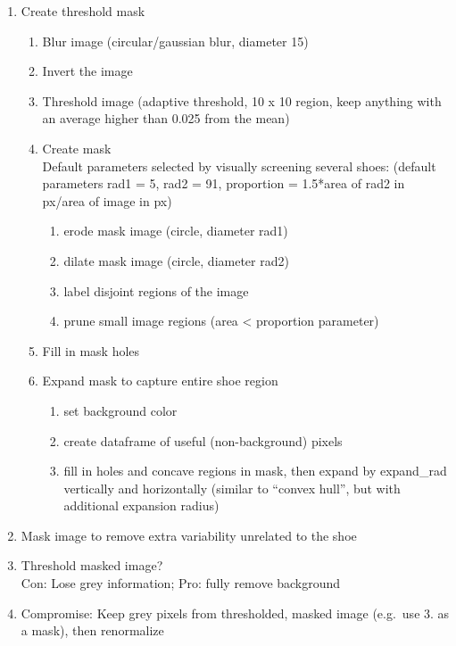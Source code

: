 \documentclass[]{book}
\providecommand{\tightlist}{%
  \setlength{\itemsep}{0pt}\setlength{\parskip}{0pt}}
\begin{document}
\begin{enumerate}
\def\labelenumi{\arabic{enumi}.}
\item
  Create threshold mask

  \begin{enumerate}
  \def\labelenumii{\alph{enumii}.}
  \tightlist
  \item
    Blur image (circular/gaussian blur, diameter 15)\\
  \item
    Invert the image\\
  \item
    Threshold image (adaptive threshold, 10 x 10 region, keep anything with an average higher than 0.025 from the mean)\\
  \item
    Create mask\\
    Default parameters selected by visually screening several shoes:
    (default parameters rad1 = 5, rad2 = {91}, proportion = 1.5*area of rad2 in px/area of image in px)\\

    \begin{enumerate}
    \def\labelenumiii{\arabic{enumiii}.}
    \tightlist
    \item
      erode mask image (circle, diameter rad1)
    \item
      dilate mask image (circle, diameter rad2)
    \item
      label disjoint regions of the image
    \item
      prune small image regions (area \textless{} proportion parameter)
    \end{enumerate}
  \item
    Fill in mask holes\\
  \item
    Expand mask to capture entire shoe region

    \begin{enumerate}
    \def\labelenumiii{\arabic{enumiii}.}
    \tightlist
    \item
      set background color
    \item
      create dataframe of useful (non-background) pixels
    \item
      fill in holes and concave regions in mask, then expand by expand\_rad vertically and horizontally (similar to ``convex hull'', but with additional expansion radius)
    \end{enumerate}
  \end{enumerate}
\item
  Mask image to remove extra variability unrelated to the shoe\\
\item
  Threshold masked image?\\
  Con: Lose grey information; Pro: fully remove background\\
\item
  Compromise: Keep grey pixels from thresholded, masked image (e.g.~use 3. as a mask), then renormalize\\
\end{enumerate}
\end{document}
